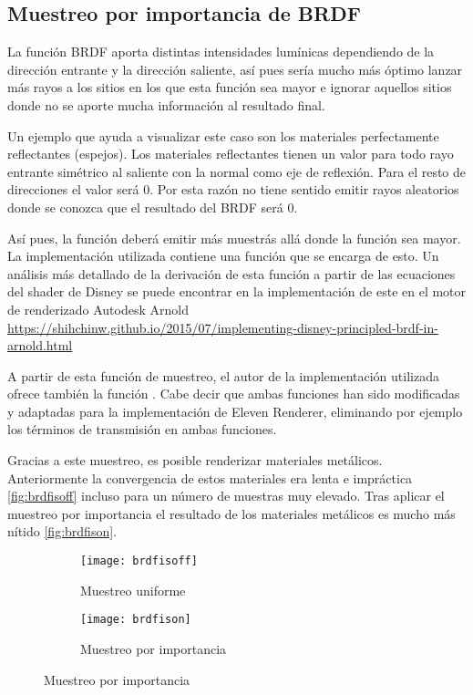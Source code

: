 \subsection{Muestreo por importancia de BRDF}

La función BRDF aporta distintas intensidades lumínicas dependiendo de la dirección entrante y la dirección saliente, así pues sería mucho más óptimo lanzar más rayos a los sitios en los que esta función sea mayor e ignorar aquellos sitios donde no se aporte mucha información al resultado final.

Un ejemplo que ayuda a visualizar este caso son los materiales perfectamente reflectantes (espejos). Los materiales reflectantes tienen un valor  para todo rayo entrante simétrico al saliente con la normal como eje de reflexión. Para el resto de direcciones el valor será 0. Por esta razón no tiene sentido emitir rayos aleatorios donde se conozca que el resultado del BRDF será 0.

Así pues, la función  deberá emitir más muestrás allá donde la función  sea mayor. La implementación utilizada contiene una función  que se encarga de esto. Un análisis más detallado de la derivación de esta función a partir de las ecuaciones del shader de Disney se puede encontrar en la implementación de este en el motor de renderizado Autodesk Arnold \url{https://shihchinw.github.io/2015/07/implementing-disney-principled-brdf-in-arnold.html}

A partir de esta función de muestreo, el autor de la implementación utilizada ofrece también la función . Cabe decir que ambas funciones han sido modificadas y adaptadas para la implementación de Eleven Renderer, eliminando por ejemplo los términos de transmisión en ambas funciones.

Gracias a este muestreo, es posible renderizar materiales metálicos. Anteriormente la convergencia de estos materiales era lenta e impráctica \autoref{fig:brdfisoff} incluso para un número de muestras muy elevado. Tras aplicar el muestreo por importancia el resultado de los materiales metálicos es mucho más nítido \autoref{fig:brdfison}.

\begin{figure}[H]
	\label{fig:brdfis}
	\centering
  \begin{subfigure}[b]{0.45\textwidth}
	\texttt{[image: brdfisoff]}
	\caption{Muestreo uniforme}
	\label{fig:brdfisoff}
  \end{subfigure}
  \hfill
  \begin{subfigure}[b]{0.45\textwidth}
	\texttt{[image: brdfison]}
	\caption{Muestreo por importancia}
	\label{fig:brdfison}
  \end{subfigure}
\end{figure}

